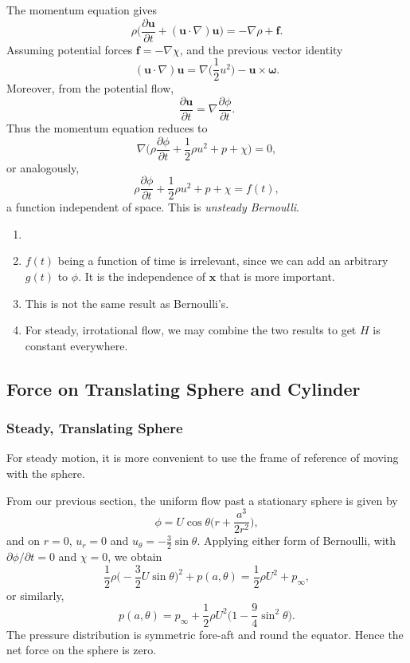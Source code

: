 \documentclass[12pt]{article}
\begin{document}
The momentum equation gives
\[
\rho \biggl( \frac{\partial \mathbf{u}}{\partial t} + (\mathbf{u} \cdot \nabla) \mathbf{u} \biggr) = - \nabla \rho + \mathbf{f}.
\]
Assuming potential forces $\mathbf{f} = - \nabla \chi$, and the previous vector identity
\[
	(\mathbf{u} \cdot \nabla) \mathbf{u} = \nabla \biggl( \frac{1}{2} u^2 \biggr) - \mathbf{u} \times \bm{\omega}.
\]
Moreover, from the potential flow,
\[
\frac{\partial \mathbf{u}}{\partial t} = \nabla \frac{\partial \phi}{\partial t}.
\]
Thus the momentum equation reduces to
\[
\nabla \biggl( \rho \frac{\partial \phi}{\partial t} + \frac{1}{2} \rho u^2 + p + \chi \biggr) = 0,
\]
or analogously,
\[
\rho \frac{\partial \phi}{\partial t} + \frac{1}{2} \rho u^2 + p + \chi = f(t),
\]
a function independent of space. This is \emph{unsteady Bernoulli}.
\begin{remark}
	\begin{enumerate}
		\item[]
		\item $f(t)$ being a function of time is irrelevant, since we can add an arbitrary $g(t)$ to $\phi$. It is the independence of $\mathbf{x}$ that is more important.
		\item This is not the same result as Bernoulli's.
		\item For steady, irrotational flow, we may combine the two results to get $H$ is constant everywhere.
	\end{enumerate}
\end{remark}

\subsection{Force on Translating Sphere and Cylinder}
\label{sub:force_on_translating_sphere_and_cylinder}

\subsubsection{Steady, Translating Sphere}
\label{subsub:steady_translating_sphere}

For steady motion, it is more convenient to use the frame of reference of moving with the sphere.

From our previous section, the uniform flow past a stationary sphere is given by
\[
\phi = U \cos \theta \biggl( r + \frac{a^3}{2r^2} \biggr),
\]
and on $r = 0$, $u_r = 0$ and $u_{\theta} = - \frac{3}{2} \sin \theta$. Applying either form of Bernoulli, with $\partial \phi/\partial t = 0$ and $\chi = 0$, we obtain
\[
\frac{1}{2} \rho \biggl( - \frac{3}{2} U \sin \theta \biggr)^2 + p(a, \theta) = \frac{1}{2} \rho U^2 + p_{\infty},
\]
or similarly,
\[
p(a, \theta) = p_{\infty} + \frac{1}{2} \rho U^2 \biggl( 1 - \frac{9}{4} \sin^2 \theta \biggr).
\]
The pressure distribution is symmetric fore-aft and round the equator. Hence the net force on the sphere is zero.
\end{document}
